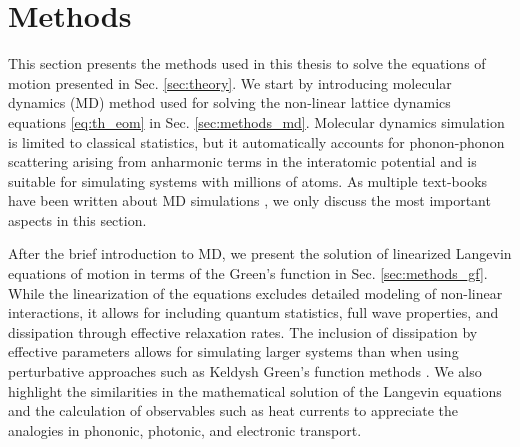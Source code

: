 


\section{Methods}
\label{sec:methods}
This section presents the methods used in this thesis to solve the equations of motion presented in Sec. \ref{sec:theory}. We start by introducing molecular dynamics (MD) method used for solving the non-linear lattice dynamics equations \eqref{eq:th_eom} in Sec. \ref{sec:methods_md}. Molecular dynamics simulation is limited to classical statistics, but it automatically accounts for phonon-phonon scattering arising from anharmonic terms in the interatomic potential and is suitable for simulating systems with millions of atoms. As multiple text-books have been written about MD simulations \cite{allentildesley,frenkelsmit}, we only discuss the most important aspects in this section.

After the brief introduction to MD, we present the solution of linearized Langevin equations of motion in terms of the Green's function in Sec. \ref{sec:methods_gf}. While the linearization of the equations excludes detailed modeling of non-linear interactions, it allows for including quantum statistics, full wave properties, and dissipation through effective relaxation rates. The inclusion of dissipation by effective parameters allows for simulating larger systems than when using perturbative approaches such as Keldysh Green's function methods \cite{haugjauho}. We also highlight the similarities in the mathematical solution of the Langevin equations and the calculation of observables such as heat currents to appreciate the analogies in phononic, photonic, and electronic transport. 


